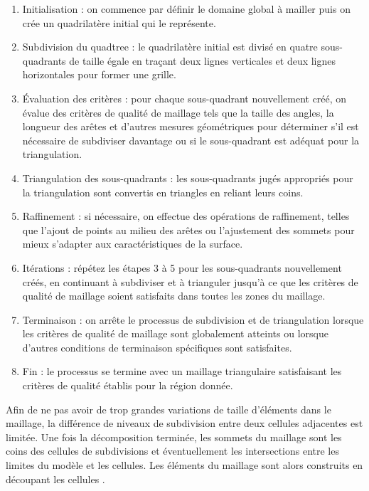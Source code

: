 \begin{enumerate}
    \item Initialisation : on commence par définir le domaine global à mailler puis on crée un quadrilatère initial qui le représente.
    
    \item Subdivision du quadtree : le quadrilatère initial est divisé en quatre sous-quadrants de taille égale en traçant deux lignes verticales et deux lignes horizontales pour former une grille.
    
    \item Évaluation des critères : pour chaque sous-quadrant nouvellement créé, on évalue des critères de qualité de maillage tels que la taille des angles, la longueur des arêtes et d'autres mesures géométriques pour déterminer s'il est nécessaire de subdiviser davantage ou si le sous-quadrant est adéquat pour la triangulation.
    
    \item Triangulation des sous-quadrants : les sous-quadrants jugés appropriés pour la triangulation sont convertis en triangles en reliant leurs coins.
    
    \item Raffinement : si nécessaire, on effectue des opérations de raffinement, telles que l'ajout de points au milieu des arêtes ou l'ajustement des sommets pour mieux s'adapter aux caractéristiques de la surface.
    
    \item Itérations : répétez les étapes 3 à 5 pour les sous-quadrants nouvellement créés, en continuant à subdiviser et à trianguler jusqu'à ce que les critères de qualité de maillage soient satisfaits dans toutes les zones du maillage.
    
    \item Terminaison : on arrête le processus de subdivision et de triangulation lorsque les critères de qualité de maillage sont globalement atteints ou lorsque d'autres conditions de terminaison spécifiques sont satisfaites.
    
    \item Fin : le processus se termine avec un maillage triangulaire satisfaisant les critères de qualité établis pour la région donnée.
\end{enumerate}

Afin de ne pas avoir de trop grandes variations de taille d’éléments dans le maillage, la différence de niveaux de subdivision entre deux cellules adjacentes est limitée. Une fois la décomposition terminée, les sommets du maillage sont les coins des cellules de subdivisions et éventuellement les intersections entre les limites du modèle et les cellules. Les éléments du maillage sont alors construits en découpant les cellules \cite{botella2016generation}.


